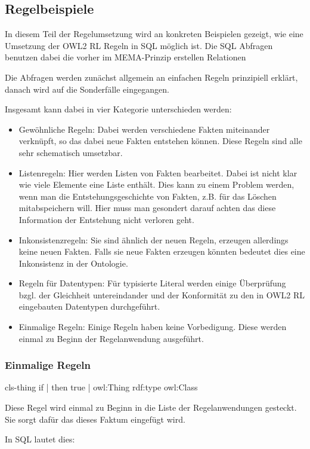\subsection{Regelbeispiele}
In diesem Teil der Regelumsetzung wird an konkreten Beispielen gezeigt, wie eine Umsetzung der OWL2 RL Regeln in SQL möglich ist. Die SQL Abfragen benutzen dabei die vorher im MEMA-Prinzip erstellen Relationen

Die Abfragen werden zunächst allgemein an einfachen Regeln prinzipiell erklärt, danach wird auf die Sonderfälle eingegangen.

Insgesamt kann dabei in vier Kategorie unterschieden werden:
\begin{itemize}
  \item Gewöhnliche Regeln: Dabei werden verschiedene Fakten miteinander verknüpft, so das dabei neue Fakten entstehen können. Diese Regeln sind alle sehr schematisch umsetzbar.
  \item Listenregeln: Hier werden Listen von Fakten bearbeitet. Dabei ist nicht klar wie viele Elemente eine Liste enthält. Dies kann zu einem Problem werden, wenn man die Entstehungsgeschichte von Fakten, z.B. für das Löschen mitabspeichern will. Hier muss man gesondert darauf achten das diese Information der Entstehung nicht verloren geht.
  \item Inkonsistenzregeln: Sie sind ähnlich der neuen Regeln, erzeugen allerdings keine neuen Fakten. Falls sie neue Fakten erzeugen könnten bedeutet dies eine Inkonsistenz in der Ontologie.
  \item Regeln für Datentypen: Für typisierte Literal werden einige Überprüfung bzgl. der Gleichheit untereindander und der Konformität zu den in OWL2 RL eingebauten Datentypen durchgeführt.
  \item Einmalige Regeln: Einige Regeln haben keine Vorbedigung. Diese werden einmal zu Beginn der Regelanwendung ausgeführt.
\end{itemize}

\subsubsection{Einmalige Regeln}

cls-thing
if | then
true | owl:Thing rdf:type owl:Class

Diese Regel wird einmal zu Beginn in die Liste der Regelanwendungen gesteckt. Sie sorgt dafür das dieses Faktum eingefügt wird.

In SQL lautet dies:

